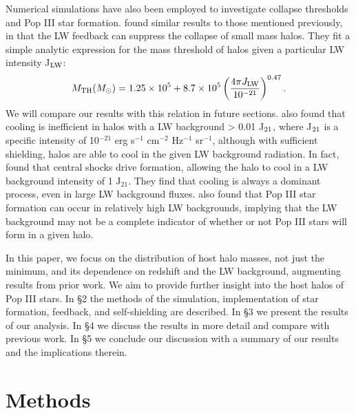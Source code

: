 \documentclass[fleqn,usenatbib]{mnras}
\begin{document}
Numerical simulations have also been employed to investigate collapse thresholds and Pop III star formation. \citet[hereafter M01]{Machacek01} found similar results to those mentioned previously, in that the LW feedback can suppress the collapse of small mass halos. They fit a simple analytic expression for the mass threshold of halos given a particular LW intensity J$_{\rm LW}$:
\begin{equation} \label{mthresh}
	M_{\rm TH} ( M_{\odot} ) = 1.25 \times 10^{5} + 8.7  \times 10^{5} \left( \frac{4 \pi J_{\rm LW}}{10^{-21}} \right)^{0.47} .
\end{equation}
We will compare our results with this relation in future sections. \citet{Yoshida03} also found that cooling is inefficient in halos with a LW background > 0.01 J$_{\rm 21}$, where J$_{\rm 21}$ is a specific intensity of 10$^{-21}$ erg s$^{-1}$ cm$^{-2}$ Hz$^{-1}$ sr$^{-1}$, although with sufficient \hh{} shielding, halos are able to cool in the given LW background radiation. In fact, \citet{Wise07_UVB} found that central shocks drive \hh{} formation, allowing the halo to cool in a LW background intensity of 1 J$_{21}$. They find that \hh{} cooling is always a dominant process, even in large LW background fluxes. \citet{OShea08} also found that Pop III star formation can occur in relatively high LW backgrounds, implying that the LW background may not be a complete indicator of whether or not Pop III stars will form in a given halo.    

In this paper, we focus on the distribution of host halo masses, not just the minimum, and its dependence on redshift and the LW background, augmenting results from prior work. We aim to provide further insight into the host halos of Pop III stars. In \S 2 the methods of the simulation, implementation of star formation, feedback, and \hh{} self-shielding are described. In \S 3 we present the results of our analysis. In \S 4 we discuss the results in more detail and compare with previous work. In \S 5 we conclude our discussion with a summary of our results and the implications therein.

\section{Methods}
\end{document}
